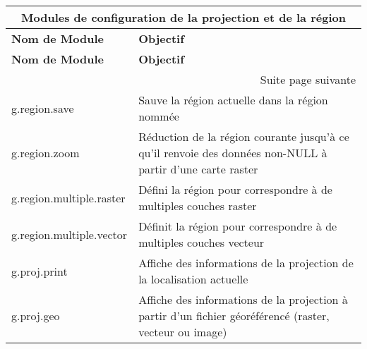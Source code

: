 \begin{center}
{\setlength{\extrarowheight}{10pt}
\small
\begin{longtable}{|p{2.5cm}|p{11.5cm}|}
  \hline \multicolumn{2}{|c|}{\textbf{Modules de configuration de la projection et de la région}} \\
\hline \textbf{Nom de Module}&\textbf{Objectif}\\
\endfirsthead
\hline \textbf{Nom de Module}&\textbf{Objectif}\\
\endhead
\hline \multicolumn{2}{|r|}{{Suite page suivante}} \\ \hline
\endfoot
\endlastfoot
\hline g.region.save & Sauve la région actuelle dans la région nommée \\
  \hline g.region.zoom & Réduction de la région courante jusqu'à ce qu'il renvoie des données non-NULL à partir d'une carte raster \\
  \hline g.region.multiple.raster & Défini la région pour correspondre à de multiples couches raster \\
  \hline g.region.multiple.vector & Définit la région pour correspondre à de multiples couches vecteur \\
  \hline g.proj.print & Affiche des informations de la projection de la localisation actuelle \\
  \hline g.proj.geo & Affiche des informations de la projection à partir d'un fichier géoréférencé (raster, vecteur ou image)\\

\end{longtable}}
\end{center}
